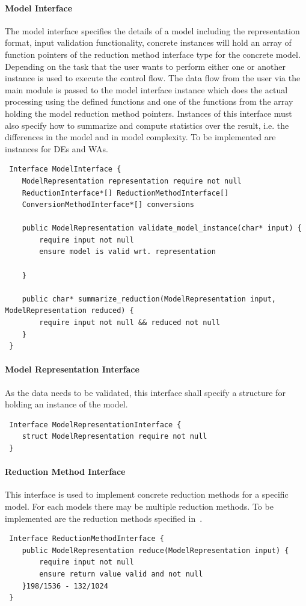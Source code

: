 			\paragraph{Model Interface}
                The model interface specifies the details of a model including the representation format, input validation functionality, concrete instances will hold an array of function pointers of the reduction method interface type for the concrete model. Depending on the task that the user wants to perform either one or another instance is used to execute the control flow. The data flow from the user via the main module is passed to the model interface instance which does the actual processing using the defined functions and one of the functions from the array holding the model reduction method pointers. Instances of this interface must also specify how to summarize and compute statistics over the result, i.e. the differences in the model and in model complexity. To be implemented are instances for DEs and WAs.
\begin{verbatim}
 Interface ModelInterface {
    ModelRepresentation representation require not null
    ReductionInterface*[] ReductionMethodInterface[]
    ConversionMethodInterface*[] conversions
    
    public ModelRepresentation validate_model_instance(char* input) {
        require input not null
        ensure model is valid wrt. representation
        
    }

    public char* summarize_reduction(ModelRepresentation input, ModelRepresentation reduced) {
        require input not null && reduced not null
    }
 }
\end{verbatim}

            \paragraph{Model Representation Interface}
                As the data needs to be validated, this interface shall specify a structure for holding an instance of the model.
\begin{verbatim}
 Interface ModelRepresentationInterface {
    struct ModelRepresentation require not null
 }
\end{verbatim}

			
			\paragraph{Reduction Method Interface}
                This interface is used to implement concrete reduction methods for a specific model. For each models there may be multiple reduction methods. To be implemented are the reduction methods specified in~\autocite{Cardelli2017MaximalAO, Kiefer2013OnTC}. 
\begin{verbatim}
 Interface ReductionMethodInterface {
    public ModelRepresentation reduce(ModelRepresentation input) {
        require input not null
        ensure return value valid and not null
    }198/1536 - 132/1024
 }
\end{verbatim}

